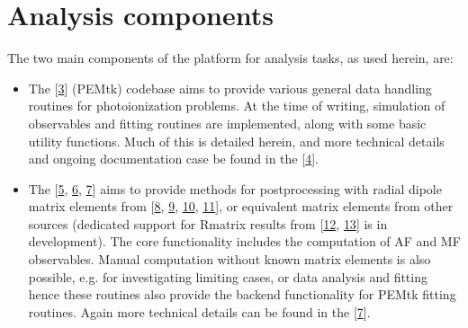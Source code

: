 \documentclass[letterpaper,10pt,english]{jupyterBook}
\begin{document}
\section{Analysis components}
\label{\detokenize{part1/platform_intro_071122:analysis-components}}\label{\detokenize{part1/platform_intro_071122:sect-platform-analysis}}
\sphinxAtStartPar
The two main components of the platform for analysis tasks, as used herein, are:
\begin{itemize}
\item {} 
\sphinxAtStartPar
The  {[}\hyperlink{cite.backmatter/bibliography:id57}{3}{]} (PEMtk) codebase aims to provide various general data handling routines for photoionization problems. At the time of writing, simulation of observables and fitting routines are implemented, along with some basic utility functions.
Much of this is detailed herein, and more technical details and ongoing documentation case be found in the  {[}\hyperlink{cite.backmatter/bibliography:id56}{4}{]}.

\item {} 
\sphinxAtStartPar
The  {[}\hyperlink{cite.backmatter/bibliography:id45}{5}, \hyperlink{cite.backmatter/bibliography:id41}{6}, \hyperlink{cite.backmatter/bibliography:id40}{7}{]} aims to provide methods for post\sphinxhyphen{}processing with  radial dipole matrix
elements from  {[}\hyperlink{cite.backmatter/bibliography:id63}{8}, \hyperlink{cite.backmatter/bibliography:id43}{9}, \hyperlink{cite.backmatter/bibliography:id66}{10}, \hyperlink{cite.backmatter/bibliography:id64}{11}{]}, or equivalent matrix elements from other sources (dedicated support for R\sphinxhyphen{}matrix results from  {[}\hyperlink{cite.backmatter/bibliography:id39}{12}, \hyperlink{cite.backmatter/bibliography:id68}{13}{]} is in development).
The core functionality includes the computation of AF and MF observables. Manual computation without known matrix elements is also possible, e.g. for investigating
limiting cases, or data analysis and fitting \sphinxhyphen{} hence these routines also provide the backend functionality for PEMtk fitting routines. Again more technical details can be found in the  {[}\hyperlink{cite.backmatter/bibliography:id40}{7}{]}.

\end{itemize}
\end{document}
